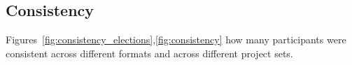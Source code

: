 \documentclass[runningheads]{llncs}
\newcommand{\kibitz}[2]{\ifnum\Comments=1{\color{#1}{#2}}\fi}
\newcommand{\rf}[1]{\kibitz{blue}{[Roy says:#1]}}
\newcommand{\gb}[1]{\kibitz{brown}{[GB:#1]}}
\begin{document}
\subsection{Consistency}
Figures~\ref{fig:consistency_elections},\ref{fig:consistency} how many participants were consistent across different formats and across different project sets.%

\end{document}
